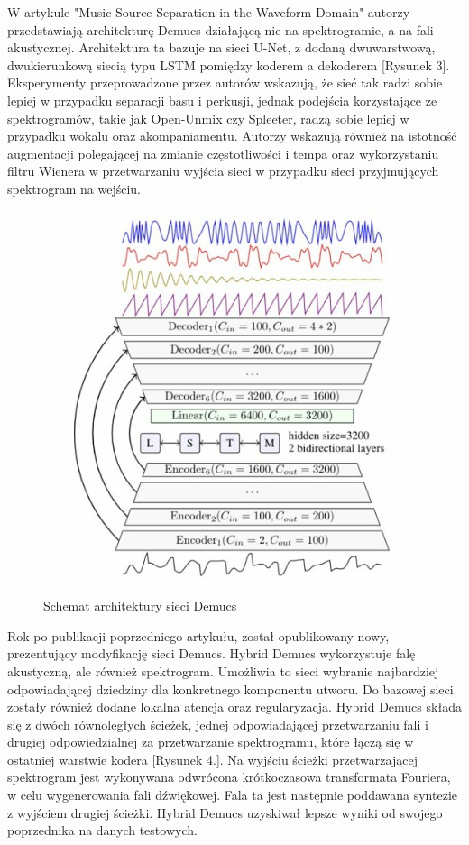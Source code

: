 \documentclass{article}
\begin{document}
W artykule "Music Source Separation in the Waveform Domain" \cite{défossez2021music} autorzy przedstawiają architekturę Demucs działającą nie na spektrogramie, a na fali akustycznej. Architektura ta bazuje na sieci U-Net, z dodaną dwuwarstwową, dwukierunkową siecią typu LSTM pomiędzy koderem a dekoderem [Rysunek 3]. Eksperymenty przeprowadzone przez autorów wskazują, że sieć tak radzi sobie lepiej w przypadku separacji basu i perkusji, jednak podejścia korzystające ze spektrogramów, takie jak Open-Unmix czy Spleeter, radzą sobie lepiej w przypadku wokalu oraz akompaniamentu. Autorzy wskazują również na istotność augmentacji polegającej na zmianie częstotliwości i tempa oraz wykorzystaniu filtru Wienera w przetwarzaniu wyjścia sieci w przypadku sieci przyjmujących spektrogram na wejściu. \\

\begin{figure}[h!]
\centering
\includegraphics[width=0.75\linewidth]{demucs.jpg}
\caption{\label{fig:unet}Schemat architektury sieci Demucs}
\end{figure}


Rok po publikacji poprzedniego artykułu, został opublikowany nowy, prezentujący modyfikację sieci Demucs. Hybrid Demucs \cite{défossez2022hybrid} wykorzystuje falę akustyczną, ale również spektrogram. Umożliwia to sieci wybranie najbardziej odpowiadającej dziedziny dla konkretnego komponentu utworu. Do bazowej sieci zostały również dodane lokalna atencja oraz regularyzacja. Hybrid Demucs składa się z dwóch równoległych ścieżek, jednej odpowiadającej przetwarzaniu fali i drugiej odpowiedzialnej za przetwarzanie spektrogramu, które łączą się w ostatniej warstwie kodera [Rysunek 4.]. Na wyjściu ścieżki przetwarzającej spektrogram jest wykonywana odwrócona krótkoczasowa transformata Fouriera, w celu wygenerowania fali dźwiękowej. Fala ta jest następnie poddawana syntezie z wyjściem drugiej ścieżki. Hybrid Demucs uzyskiwał lepsze wyniki od swojego poprzednika na danych testowych. \\
\end{document}
